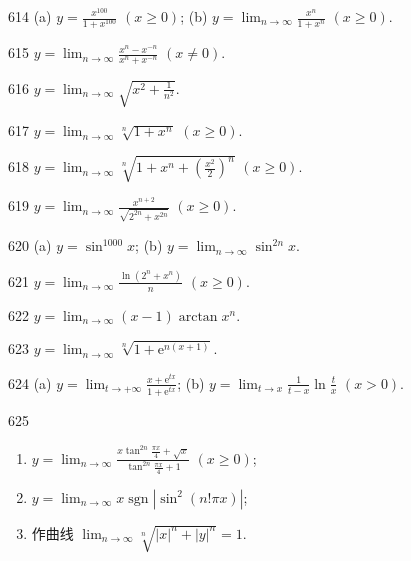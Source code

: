 \begin{prob}[M]{614}
(a) $y = \frac{x^{100}}{1 + x^{100}}$ $(x \geqslant 0)$; \qquad (b) $y = \lim_{n \to \infty} \frac{x^n}{1 + x^n}$ $(x \geqslant 0)$.
\end{prob}

\begin{prob}[M]{615}
$y = \lim_{n \to \infty} \frac{x^n - x^{-n}}{x^n + x^{-n}}$ $(x \neq 0)$.
\end{prob}

\begin{prob}[M]{616}
$y = \lim_{n \to \infty} \sqrt{x^2 + \frac{1}{n^2}}$.
\end{prob}

\begin{prob}[M]{617}
$y = \lim_{n \to \infty} \sqrt[n]{1 + x^n}$ $(x \geqslant 0)$.
\end{prob}

\begin{prob}[M]{618}
$y = \lim_{n \to \infty} \sqrt[n]{1 + x^n + \left(\frac{x^2}{2}\right)^n}$ $(x \geqslant 0)$.
\end{prob}

\begin{prob}[M]{619}
$y = \lim_{n \to \infty} \frac{x^{n+2}}{\sqrt{2^{2n} + x^{2n}}}$ $(x \geqslant 0)$.
\end{prob}

\begin{prob}[M]{620}
(a) $y = \sin^{1000} x$; \qquad (b) $y = \lim_{n \to \infty} \sin^{2n} x$.
\end{prob}

\begin{prob}[M]{621}
$y = \lim_{n \to \infty} \frac{\ln(2^n + x^n)}{n}$ $(x \geqslant 0)$.
\end{prob}

\begin{prob}[M]{622}
$y = \lim_{n \to \infty} (x - 1)\arctan x^n$.
\end{prob}

\begin{prob}[M]{623}
$y = \lim_{n \to \infty} \sqrt[n]{1 + \mathrm{e}^{n(x+1)}}$.
\end{prob}

\begin{prob}[M]{624}
(a) $y = \lim_{t \to +\infty} \frac{x + \mathrm{e}^{tx}}{1 + \mathrm{e}^{tx}}$; \qquad (b) $y = \lim_{t \to x} \frac{1}{t - x}\ln\frac{t}{x}$ $(x > 0)$.
\end{prob}

\begin{prob}[L]{625}
\begin{enumerate}[label=(\alph*), itemsep=2pt, topsep=3pt]
\item $y = \lim_{n \to \infty} \frac{x\tan^{2n}\frac{\pi x}{4} + \sqrt{x}}{\tan^{2n}\frac{\pi x}{4} + 1}$ $(x \geqslant 0)$;
\item $y = \lim_{n \to \infty} x\operatorname{sgn}|\sin^2(n!\pi x)|$;
\item 作曲线 $\lim_{n \to \infty} \sqrt[n]{|x|^n + |y|^n} = 1$.
\end{enumerate}
\end{prob}

